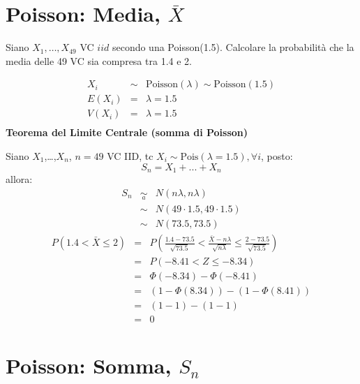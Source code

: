 \documentclass[
  11pt,
]{book}
\theoremstyle{mytheoremstyle}
\theoremstyle{mydefstyle}
\newenvironment{sol}
  {
  \begin{tcolorbox}[enhanced,breakable,arc=0.1mm,boxrule=1pt,colback=white,colframe=iblue,
  title=\bf \fontfamily{lmss}\selectfont \hspace{.5 cm} Soluzione,drop fuzzy shadow]

}{
\end{tcolorbox}
  }
\begin{document}
\section{\texorpdfstring{Poisson: Media, \(\bar{X}\)}{Poisson: Media, \textbackslash bar\{X\}}}\label{poisson-media-barx}

Siano \(X_{1}, \ldots, X_{49}\) VC \(iid\) secondo una Poisson(1.5).
Calcolare la probabilità che la media delle 49 VC sia compresa tra 1.4 e
2.

\begin{sol}
\begin{eqnarray*}
X_{i}    &\sim& \mbox{Poisson}(\lambda) \sim \mbox{Poisson}(1.5)  \\
E(X_{i})    &=& \lambda = 1.5                                  \\
V(X_{i})    &=& \lambda = 1.5                                  \\
\end{eqnarray*}
\textbf{Teorema del Limite Centrale (somma di Poisson)}

Siano \(X_1\),\ldots,\(X_n\), \(n=49\) VC IID, tc \(X_i\sim\text{Pois}(\lambda=1.5)\)\(,\forall i\), posto:
\[
      S_n = X_1 + ... + X_n
      \]
allora:\begin{eqnarray*}
  S_n & \mathop{\sim}\limits_{a}& N(n\lambda,n\lambda) \\
  &\sim & N(49\cdot1.5,49\cdot1.5) \\
     &\sim & N(73.5,73.5) 
  \end{eqnarray*}\begin{eqnarray*}
   P( 1.4 < \bar X \leq  2 ) &=& P\left( \frac { 1.4  -  73.5 }{\sqrt{ 73.5 }} < \frac { \bar X  -  n\lambda }{ \sqrt{n\lambda} } \leq \frac { 2  -  73.5 }{\sqrt{ 73.5 }}\right)  \\
              &=& P\left(  -8.41  < Z \leq  -8.34 \right) \\
              &=& \Phi( -8.34 )-\Phi( -8.41 )\\
              &=&  (1-\Phi( 8.34 ))-(1-\Phi( 8.41 )) \\ &=& (1- 1 )-(1- 1 ) \\ 
              &=&  0 
   \end{eqnarray*}

\end{sol}

\section{\texorpdfstring{Poisson: Somma, \(S_{n}\)}{Poisson: Somma, S\_\{n\}}}\label{poisson-somma-s_n-1}
\end{document}
